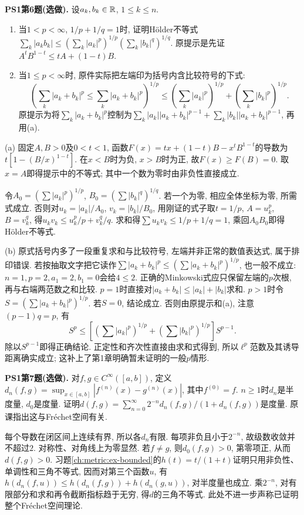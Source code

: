 \begin{exercise}\label{ps190:1:6}
\textbf{PS1第6题(选做).} 设$a_k,b_k\in\mathbb R$, $1\le k\le n$.
\begin{enumerate}[label=(\alph*)]
\item 当$1<p<\infty$, $1/p+1/q=1$时, 证明H\"older不等式$\sum_k|a_kb_k|\le(\sum_k|a_k|^p)^{1/p}(\sum_k|b_k|^q)^{1/q}$. 原提示是先证$A^tB^{1-t}\le tA+(1-t)B$.
\item 当$1\le p<\infty$时, 原件实际把左端印为括号内含比较符号的下式:
\[
 \left(\sum_k|a_k+b_k|^p\le\sum_k|a_k+b_k|^p\right)^{1/p}
 \le\left(\sum_k|a_k|^p\right)^{1/p}
   +\left(\sum_k|b_k|^p\right)^{1/p}.
\]
原提示为将$\sum_k|a_k+b_k|^p$控制为$\sum_k|a_k||a_k+b_k|^{p-1}+\sum_k|b_k||a_k+b_k|^{p-1}$, 再用(a).
\end{enumerate}
\end{exercise}
\begin{solution}
(a) 固定$A,B>0$及$0<t<1$, 函数$F(x)=tx+(1-t)B-x^tB^{1-t}$的导数为$t[1-(B/x)^{1-t}]$. 在$x<B$时为负, $x>B$时为正, 故$F(x)\ge F(B)=0$. 取$x=A$即得提示中的不等式; 其中一个数为零时由非负性直接成立.

令$A_0=(\sum|a_k|^p)^{1/p}$, $B_0=(\sum|b_k|^q)^{1/q}$. 若一个为零, 相应全体坐标为零, 所需式成立. 否则对$u_k=|a_k|/A_0$, $v_k=|b_k|/B_0$, 用刚证的式子取$t=1/p$, $A=u_k^p$, $B=v_k^q$, 得$u_kv_k\le u_k^p/p+v_k^q/q$. 求和得$\sum u_kv_k\le1/p+1/q=1$, 乘回$A_0B_0$即得H\"older不等式.

(b) 原式括号内多了一段重复求和与比较符号, 左端并非正常的数值表达式, 属于排印错误. 若按抽取文字把它读作$\sum|a_k+b_k|^p\le(\sum|a_k+b_k|^p)^{1/p}$, 也一般不成立: $n=1,p=2,a_1=2,b_1=0$会给$4\le2$. 正确的Minkowski式应只保留左端的$p$次根, 再与右端两范数之和比较. $p=1$时直接对$|a_k+b_k|\le|a_k|+|b_k|$求和. $p>1$时令$S=(\sum|a_k+b_k|^p)^{1/p}$. 若$S=0$, 结论成立. 否则由原提示和(a), 注意$(p-1)q=p$, 有
\[
 S^p\le
 \left[\left(\sum|a_k|^p\right)^{1/p}
 +\left(\sum|b_k|^p\right)^{1/p}\right]S^{p-1}.
\]
除以$S^{p-1}$即得正确结论. 正定性和齐次性直接由求和式得到, 所以$\ell^p$范数及其诱导距离确实成立; 这补上了第1章明确暂未证明的一般$p$情形.
\end{solution}

\begin{exercise}\label{ps190:1:7}
\textbf{PS1第7题(选做).} 对$f,g\in C^\infty([a,b])$, 定义$d_n(f,g)=\sup_{x\in[a,b]}|f^{(n)}(x)-g^{(n)}(x)|$, 其中$f^{(0)}=f$. $n\ge1$时$d_n$是半度量, $d_0$是度量. 证明$d(f,g)=\sum_{n=0}^\infty 2^{-n}d_n(f,g)/(1+d_n(f,g))$是度量. 原课指出这与Fr\'echet空间有关.
\end{exercise}
\begin{solution}
每个导数在闭区间上连续有界, 所以各$d_n$有限. 每项非负且小于$2^{-n}$, 故级数收敛并不超过$2$. 对称性、对角线上为零显然. 若$f\ne g$, 则$d_0(f,g)>0$, 第零项正, 从而$d(f,g)>0$. 习题\ref{ch:metric:ex-bounded}的$h(t)=t/(1+t)$证明只用非负性、单调性和三角不等式, 因而对第三个函数$u$, 有$h(d_n(f,u))\le h(d_n(f,g))+h(d_n(g,u))$, 对半度量也成立. 乘$2^{-n}$, 对有限部分和求和再令截断指标趋于无穷, 得$d$的三角不等式. 此处不进一步声称已证明整个Fr\'echet空间理论.
\end{solution}

